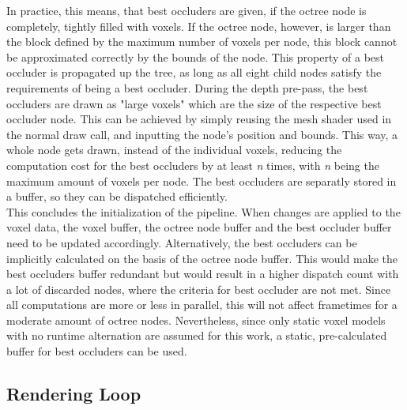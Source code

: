 \noindent
In practice, this means, that best occluders are given, if the octree node is completely, tightly filled 
with voxels. If the octree node, however, is larger than the block defined by the maximum number of voxels 
per node, this block cannot be approximated correctly by the bounds of the node. This property of a best 
occluder is propagated up the tree, as long as all eight child nodes satisfy the requirements of being a 
best occluder. During the depth pre-pass, the best occluders are drawn as "large voxels" which are the size 
of the respective best occluder node. This can be achieved by simply reusing the mesh shader used in the 
normal draw call, and inputting the node's position and bounds. This way, a whole node gets drawn, instead 
of the individual voxels, reducing the computation cost for the best occluders by at least \emph{n} times, 
with \emph{n} being the maximum amount of voxels per node. The best occluders are separatly stored in a 
buffer, so they can be dispatched efficiently. \\


\noindent
This concludes the initialization of the pipeline. When changes are applied to the voxel data, the voxel buffer,
the octree node buffer and the best occluder buffer need to be updated accordingly. Alternatively, the best 
occluders can be implicitly calculated on the basis of the octree node buffer. This would make the best 
occluders buffer redundant but would result in a higher dispatch count with a lot of discarded nodes, 
where the criteria for best occluder are not met. Since all computations are more or less in parallel, this 
will not affect frametimes for a moderate amount of octree nodes. Nevertheless, since only static voxel models with 
no runtime alternation are assumed for this work, a static, pre-calculated buffer for best occluders can be used.

\subsection*{Rendering Loop} \label{sec-rendering-loop}

